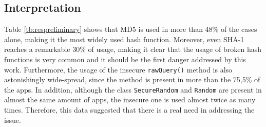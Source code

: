 \subsection{Interpretation}
Table \ref{tb:respreliminary} shows that MD5 is used in more than 48\% of the cases alone, making it the most widely used hash function. Moreover, even SHA-1 reaches a remarkable 30\% of usage, making it clear that the usage of broken hash functions is very common and it should be the first danger addressed by this work. Furthermore, the usage of the insecure \texttt{rawQuery()} method is also astonishingly wide-spread, since the method is present in more than the 75,5\% of the apps. In addition, although the class \texttt{SecureRandom} and \texttt{Random} are present in almost the same amount of apps, the insecure one is used almost twice as many times. Therefore, this data suggested that there is a real need in addressing the issue.

